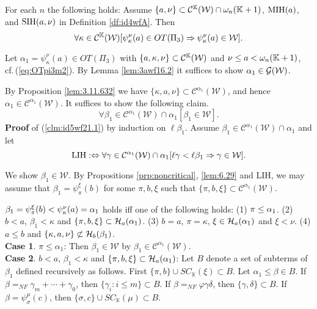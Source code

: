 \documentclass{article}
\newcommand{\mK}{\mathbb{K}}
\begin{document}
\begin{lemma}\label{th:id5wf21}
For {\rm each} $n$ the following holds:
Assume $\{a,\nu\}\subset\mathcal{C}^{\mK}(\calw)\cap\ome_{n}(\mK+1)$, 
$\mbox{{\rm MIH}}(a)$, and 
$\mbox{{\rm SIH}}(a,\nu)$ in Definition \ref{df:id4wfA}.
Then
\[
 \forall\kappa\in\mathcal{C}^{\mK}(\calw)[\psi_{\kappa}^{\nu}(a)\in OT(\Pi_{3}) \Rarw 
 \psi_{\kappa}^{\nu}(a)\in\mathcal{W}].
\]
\end{lemma}
\bprf
Let $\alpha_{1}=\psi_{\kappa}^{\nu}(a)\in OT(\Pi_{3})$ with 
$\{a,\kap,\nu\}\subset\mathcal{C}^{\mK}(\calw)$ and $\nu\leq a<\ome_{n}(\mK+1)$, cf.\,(\ref{eq:OTpi3m2}). 
By Lemma \ref{lem:3awf16.2} it suffices to show $\alpha_{1}\in\mathcal{G}({\cal W})$.


By Proposition \ref{lem:3.11.632} we have
$\{\kappa,a, \nu\}\subset\mathcal{C}^{\alpha_{1}}(\mathcal{W})$, and hence $\alpha_{1}\in\mathcal{C}^{\alpha_{1}}(\mathcal{W})$.
It suffices to show the following claim.
\begin{equation}\label{clm:id5wf21.1}
\forall\beta_{1}\in\mathcal{C}^{\alpha_{1}}(\mathcal{W})\cap\alpha_{1}[\beta_1\in\mathcal{W}].
\end{equation}
\textbf{Proof} of (\ref{clm:id5wf21.1}) by induction on $\ell\beta_1$. 
Assume $\beta_{1}\in\mathcal{C}^{\alpha_{1}}(\mathcal{W})\cap\alpha_{1}$ and let
\[
\mbox{LIH} :\Leftrightarrow
\forall\gamma\in\mathcal{C}^{\alpha_{1}}(\mathcal{W})\cap\alpha_{1}[\ell\gamma<\ell\beta_{1} \Rightarrow \gamma\in\mathcal{W}].
\]

We show $\beta_1\in\mathcal{W}$. 
By Propositions \ref{prp:noncritical}, \ref{lem:6.29} and LIH, we may assume that
$\beta_{1}=\psi_{\pi}^{\xi}(b)$ for some $\pi,b,\xi$ such that
$\{\pi,b,\xi\}\subset\mathcal{C}^{\alpha_{1}}(\mathcal{W})$.

$\beta_{1}=\psi_{\pi}^{\xi}(b)<\psi_{\kappa}^{\nu}(a)=\alpha_{1}$ holds iff
one of the following holds:
(1) $\pi\leq\alpha_{1}$. (2) $b<a$, $\beta_{1}<\kappa$ and $\{\pi,b,\xi\}\subset{\cal H}_{a}(\alpha_{1})$.
(3) $b=a$, $\pi=\kappa$, $\xi\in{\cal H}_{a}(\alpha_{1})$ and $\xi<\nu$.
(4) $a\leq b$ and $\{\kappa,a,\nu\}\not\subset{\cal H}_{b}(\beta_{1})$.
\\
\textbf{Case 1}. $\pi\leq\alpha_{1}$: 
Then $\beta_{1}\in\mathcal{W}$ by $\beta_{1}\in\mathcal{C}^{\alpha_{1}}(\mathcal{W})$.
\\
\textbf{Case 2}.
$b<a$, $\beta_{1}<\kappa$ and $\{\pi,b,\xi\}\subset{\cal H}_{a}(\alpha_{1})$:
Let $B$ denote a set of subterms of $\beta_{1}$ defined recursively as follows.
First $\{\pi,b\}\cup SC_{\mK}(\xi)\subset B$.
Let $\alpha_{1}\leq\beta\in B$. 
If $\beta=_{NF}\gamma_{m}+\cdots+\gamma_{0}$, then $\{\gamma_{i}:i\leq m\}\subset B$.
If $\beta=_{NF}\varphi\gamma\delta$, then $\{\gamma,\delta\}\subset B$.
If $\beta=\psi_{\sigma}^{\mu}(c)$, then $\{\sigma,c\}\cup SC_{\mK}(\mu)\subset B$.
\end{document}
